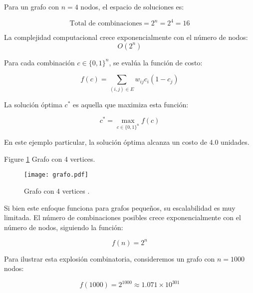 \documentclass[9pt,a4paper,twoside]{rho-class/rho}
\begin{document}
            Para un grafo con $n=4$ nodos, el espacio de soluciones es:

            \begin{equation}
                \text{Total de combinaciones} = 2^n = 2^4 = 16
            \end{equation}

            La complejidad computacional crece exponencialmente con el número de nodos: \begin{equation}O(2^n)\end{equation}

            Para cada combinación $c \in \{0,1\}^n$, se evalúa la función de costo:

            \begin{equation}
                f(c) = \sum_{(i,j) \in E} w_{ij}c_i(1-c_j)
            \end{equation}

            La solución óptima $c^*$ es aquella que maximiza esta función:

            \begin{equation}
                c^* = \max_{c \in \{0,1\}^n} f(c)
            \end{equation}

            En este ejemplo particular, la solución óptima alcanza un costo de 4.0 unidades.

            Figure \ref{fig:figure} Grafo con 4 vertices.
                
            \begin{figure}[H]
                \centering
                \texttt{[image: grafo.pdf]}
                \caption{Grafo con 4 vertices \cite{PFGPlots}.}
                \label{fig:figure}
            \end{figure}

            Si bien este enfoque funciona para grafos pequeños, su escalabilidad es muy limitada. El número de combinaciones posibles crece exponencialmente con el número de nodos, siguiendo la función:

            \begin{equation}
                f(n) = 2^n
            \end{equation}

            Para ilustrar esta explosión combinatoria, consideremos un grafo con $n = 1000$ nodos:

            \begin{equation}
                f(1000) = 2^{1000} \approx 1.071 \times 10^{301}
            \end{equation}
\end{document}

